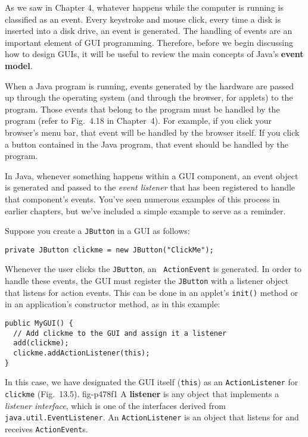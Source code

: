 \noindent As we saw in Chapter 4, whatever happens while the computer
is running is classified as an event.  Every keystroke and mouse
click, every time a disk is inserted into a disk drive, an event is
generated.  The handling of events are an important element of GUI
programming. Therefore, before we begin discussing how to design GUIs,
it will be useful to review the main concepts of Java's {\bf event
model}.

When a Java program is running, events generated by the hardware are
passed up through the operating system (and through the browser, for
applets) to the program.  Those events that belong to the program must
be handled by the program (refer to Fig.~4.18 in
Chapter~4). For example, if you click your browser's menu bar, that
event will be handled by the browser itself.  If you click a button
contained in the Java program, that event should be handled by the
program.

In Java, whenever something happens within a GUI component, an event
object is generated and passed to the {\it event listener} that has
been registered to handle that component's events.  You've seen
numerous examples of this process in earlier chapters, but we've
included a simple example to serve as a reminder.

Suppose you create a {\tt JButton} in a GUI as follows:

\begin{jjjlisting}
\begin{lstlisting}
private JButton clickme = new JButton("ClickMe");
\end{lstlisting}
\end{jjjlisting}

\noindent Whenever the user clicks the {\tt JButton}, an {\tt
ActionEvent} is generated.  In order to handle these events, the GUI
must register the {\tt JButton} with a listener object that listens
for action events.  This can be done in an applet's {\tt init()}
method or in an application's constructor method, as in this example:

\begin{jjjlisting}
\begin{lstlisting}
public MyGUI() {
  // Add clickme to the GUI and assign it a listener
  add(clickme);  
  clickme.addActionListener(this); 
}
\end{lstlisting}
\end{jjjlisting}

\noindent In this case, we have designated the GUI itself ({\tt this})
as an {\tt ActionListener} for {\tt clickme} (Fig.~13.5).
{fig-p478f1}
A {\bf listener} is any object that implements a {\it listener
interface}, which is one of the interfaces derived from {\tt
java.util.Event\-Listener}.  An {\tt ActionListener} is an object that
listens for and receives {\tt ActionEvent}s.

